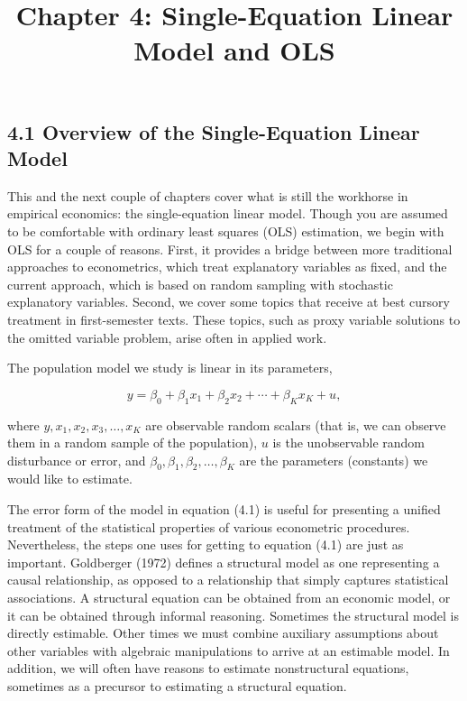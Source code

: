 \documentclass[10pt]{article}
\title{Chapter 4: Single-Equation Linear Model and OLS}
\author{}
\date{}
\begin{document}
\maketitle

\subsection*{4.1 Overview of the Single-Equation Linear Model}
This and the next couple of chapters cover what is still the workhorse in empirical economics: the single-equation linear model. Though you are assumed to be comfortable with ordinary least squares (OLS) estimation, we begin with OLS for a couple of reasons. First, it provides a bridge between more traditional approaches to econometrics, which treat explanatory variables as fixed, and the current approach, which is based on random sampling with stochastic explanatory variables. Second, we cover some topics that receive at best cursory treatment in first-semester texts. These topics, such as proxy variable solutions to the omitted variable problem, arise often in applied work.

The population model we study is linear in its parameters,


\begin{equation*}
y=\beta_{0}+\beta_{1} x_{1}+\beta_{2} x_{2}+\cdots+\beta_{K} x_{K}+u, \tag{4.1}
\end{equation*}


where $y, x_{1}, x_{2}, x_{3}, \ldots, x_{K}$ are observable random scalars (that is, we can observe them in a random sample of the population), $u$ is the unobservable random disturbance or error, and $\beta_{0}, \beta_{1}, \beta_{2}, \ldots, \beta_{K}$ are the parameters (constants) we would like to estimate.

The error form of the model in equation (4.1) is useful for presenting a unified treatment of the statistical properties of various econometric procedures. Nevertheless, the steps one uses for getting to equation (4.1) are just as important. Goldberger (1972) defines a structural model as one representing a causal relationship, as opposed to a relationship that simply captures statistical associations. A structural equation can be obtained from an economic model, or it can be obtained through informal reasoning. Sometimes the structural model is directly estimable. Other times we must combine auxiliary assumptions about other variables with algebraic manipulations to arrive at an estimable model. In addition, we will often have reasons to estimate nonstructural equations, sometimes as a precursor to estimating a structural equation.
\end{document}
